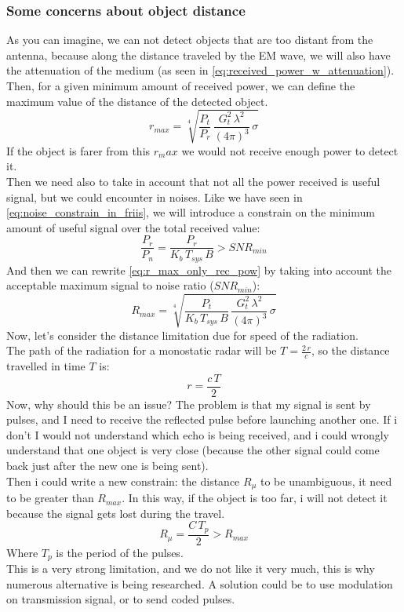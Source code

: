 \subsubsection*{Some concerns about object distance}
As you can imagine, we can not detect objects that are too distant from the antenna, because along the distance traveled by the EM wave, we will also have the attenuation of the medium (as seen in \cref{eq:received_power_w_attenuation}).\\
Then, for a given minimum amount of received power, we can define the maximum value of the distance of the detected object. 
\begin{equation}\label{eq:r_max_only_rec_pow}
    r_{max}=\sqrt[4]{\frac{P_t}{P_r}\,\frac{G_t^2\,\lambda^2}{(4\pi)^3}\,\sigma}
\end{equation}
If the object is farer from this $r_max$ we would not receive enough power to detect it.\\
Then we need also to take in account that not all the power received is useful signal, but we could encounter in noises. Like we have seen in \cref{eq:noise_constrain_in_friis}, we will introduce a constrain on the minimum amount of useful signal over the total received value:
\begin{equation}
    \frac{P_r}{P_n}=\frac{P_r}{K_b\,T_{sys}\,B}>SNR_{min}
\end{equation}
And then we can rewrite \cref{eq:r_max_only_rec_pow} by taking into account the acceptable maximum signal to noise ratio ($SNR_{min}$):
\begin{equation}
    R_{max}=\sqrt[4]{\frac{P_t}{K_b\,T_{sys}\,B}\,\frac{G_t^2\,\lambda^2}{(4\pi)^3}\,\sigma}
\end{equation}
Now, let's consider the distance limitation due for speed of the radiation.\\
The path of the radiation for a monostatic radar will be $T=\frac{2\,r}{c}$, so the distance travelled in time $T$ is:
\begin{equation}
    r=\frac{c\,T}{2}
\end{equation}
Now, why should this be an issue? The problem is that my signal is sent by pulses, and I need to receive the reflected pulse before launching another one. If i don't I would not understand which echo is being received, and i could wrongly understand that one object is very close (because the other signal could come back just after the new one is being sent).\\
Then i could write a new constrain: the distance $R_\mu$ to be unambiguous, it need to be greater than $R_{max}$. In this way, if the object is too far, i will not detect it because the signal gets lost during the travel.
\begin{equation}
    R_\mu=\frac{C\,T_p}{2}>R_{max}
\end{equation}
Where $T_p$ is the period of the pulses.\\
This is a very strong limitation, and we do not like it very much, this is why numerous alternative is being researched. A solution could be to use modulation on transmission signal, or to send coded pulses.
